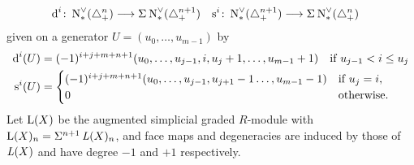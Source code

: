 \begin{align*}
	\operatorname{d}^i\colon \operatorname{N}^\vee_{*}(\triangle_{+}^n) &\longrightarrow \Sigma^{}\operatorname{N}^\vee_{*}(\triangle_{+}^{n+1})
	&
	\operatorname{s}^i\colon \operatorname{N}^\vee_{*}(\triangle_{+}^{n+1}) &\longrightarrow \Sigma^{}\operatorname{N}^\vee_{*}(\triangle_{+}^n)
\end{align*}
given on a generator $U=(u_0,\ldots,u_{m-1})$ by
\begin{align*}
	\operatorname{d}^i(U) &=
	(-1)^{i+j+m+n+1}(u_0,\ldots,u_{j-1},i,u_{j}+1,\ldots,u_{m-1}+1)
	\quad \text{if $u_{j-1}<i \leq u_{j}$}
	\\
	\operatorname{s}^i(U) &= \begin{cases}
	(-1)^{i+j+m+n+1}(u_0,\ldots,u_{j-1},u_{j+1}-1\ldots,u_{m-1}-1) 	& \text{if $u_{j} = i$,}
	\\
	0 & \text{otherwise.}
	\end{cases}
\end{align*}
 Let $\operatorname{L}(X)$ be the augmented simplicial graded $R$-module with $\operatorname{L}(X)_n = \Sigma^{n+1}\operatorname{{\it L}}(X)_{n}$, and face maps and degeneracies are induced by those of $\operatorname{{\it L}}(X)$ and have degree $-1$ and $+1$ respectively.

